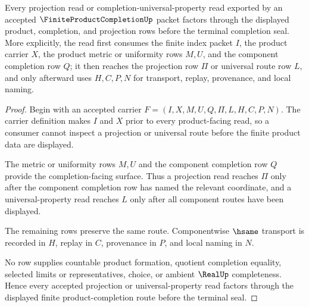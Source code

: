 \begin{theorem}
\label{thm:finite-product-completion-projection-universal-route}
Every projection read or completion-universal-property read exported by an accepted $\FiniteProductCompletionUp$ packet factors through the displayed product, completion, and projection rows before the terminal completion seal. More explicitly, the read first consumes the finite index packet $I$, the product carrier $X$, the product metric or uniformity rows $M,U$, and the component completion row $Q$; it then reaches the projection row $\Pi$ or universal route row $L$, and only afterward uses $H,C,P,N$ for transport, replay, provenance, and local naming.
\end{theorem}
\begin{proof}
Begin with an accepted carrier $F=(I,X,M,U,Q,\Pi,L,H,C,P,N)$. The carrier definition makes $I$ and $X$ prior to every product-facing read, so a consumer cannot inspect a projection or universal route before the finite product data are displayed.

The metric or uniformity rows $M,U$ and the component completion row $Q$ provide the completion-facing surface. Thus a projection read reaches $\Pi$ only after the component completion row has named the relevant coordinate, and a universal-property read reaches $L$ only after all component routes have been displayed.

The remaining rows preserve the same route. Componentwise $\hsame$ transport is recorded in $H$, replay in $C$, provenance in $P$, and local naming in $N$.

No row supplies countable product formation, quotient completion equality, selected limits or representatives, choice, or ambient $\RealUp$ completeness. Hence every accepted projection or universal-property read factors through the displayed finite product-completion route before the terminal seal.
\end{proof}

